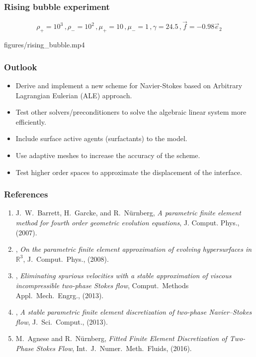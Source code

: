 \documentclass{beamer}
\begin{document}
\begin{frame}
\frametitle{Rising bubble experiment}

\begin{equation*}
\rho_+ = 10^3\,, \rho_- = 10^2\,, \mu_+ = 10\,, \mu_- = 1\,, \gamma = 24.5\,,
\vec f = -0.98\vec e_2
\end{equation*}

\centering

{figures/rising_bubble.mp4}

\end{frame}

\begin{frame}
\frametitle{Outlook}

\begin{itemize}
\item Derive and implement a new scheme for Navier-Stokes based on Arbitrary
Lagrangian Eulerian (ALE) approach.
\item Test other solvers/preconditioners to solve the algebraic linear system
more efficiently.
\item Include surface active agents (surfactants) to the model.
\item Use adaptive meshes to increase the accuracy of the scheme.
\item Test higher order spaces to approximate the displacement of the interface.
\end{itemize}
\end{frame}

\begin{frame}
\frametitle{References}

\begin{enumerate}
\item
{\sc J.~W.~Barrett, H.~Garcke, and R.~N\"urnberg}, {\em A parametric finite
element method for fourth order geometric evolution equations},
\blue J. Comput. Phys., \black (2007).

\item
\leavevmode\vrule height 2pt depth -1.6pt width 23pt,
{\em On the parametric finite element approximation of evolving hypersurfaces
in {${\mathbb R}^3$}},
\blue J.\ Comput.\ Phys., \black (2008).

\item
\leavevmode\vrule height 2pt depth -1.6pt width 23pt,
{\em Eliminating spurious velocities with a stable approximation of
viscous incompressible two-phase {S}tokes flow},
\blue Comput.\ Methods Appl.\ Mech.\ Engrg., \black (2013).

\item
\leavevmode\vrule height 2pt depth -1.6pt width 23pt,
{\em A stable parametric finite element discretization of two-phase
{N}avier--{S}tokes flow}, \blue J.\ Sci.\ Comput., \black (2013).

\item
{\sc M.~Agnese and R.~N\"urnberg}, {\em Fitted Finite Element Discretization of
Two-Phase {S}tokes Flow}, \blue Int.\ J.\ Numer.\ Meth.\ Fluids, \black (2016).
\end{enumerate}
\end{frame}
\end{document}
